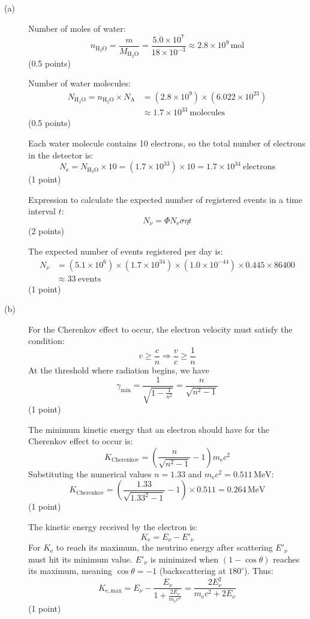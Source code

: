 \begin{description}
\item[(a)] Number of moles of water:
  \[ n_{\mathrm{H_2O}} = \frac{m}{M_{\mathrm{H_2O}}}
     = \frac{5.0 \times 10^7}{18 \times 10^{-3}}
     \approx 2.8 \times 10^9\,\mathrm{mol} \]
  \hfill(0.5 points)

  Number of water molecules:
  \begin{align*}
    N_{\mathrm{H_2O}} = n_{\mathrm{H_2O}} \times N_{\mathrm{A}}
      &= (2.8 \times 10^9) \times (6.022 \times 10^{23}) \\
      &\approx 1.7 \times 10^{33}\ \mathrm{molecules}
  \end{align*}
  \hfill(0.5 points)

  Each water molecule contains 10 electrons, so the total number of electrons
  in the detector is:
  \[ N_{\mathrm{e}} = N_{\mathrm{H_2O}} \times 10
     = (1.7 \times 10^{33}) \times 10 = 1.7 \times 10^{34}\ \mathrm{electrons} \]
  \hfill(1 point)

  Expression to calculate the expected number of registered events in a time
  interval $t$:
  \[ N_\nu = \Phi N_{\mathrm{e}} \sigma \eta t \]
  \hfill(2 points)

  The expected number of events registered per day is:
  \begin{align*}
    N_\nu &= (5.1 \times 10^6) \times (1.7 \times 10^{34})
             \times (1.0 \times 10^{-44}) \times 0.445 \times 86400 \\
          &\approx 33\ \mathrm{events}
  \end{align*}
  \hfill(1 point)

\item[(b)] For the Cherenkov effect to occur, the electron velocity must
  satisfy the condition:
  \[ v \ge \frac{c}{n} \Longrightarrow \frac{v}{c} \ge \frac{1}{n} \]
  At the threshold where radiation begins, we have
  \[ \gamma_{\mathrm{min}} = \frac{1}{\sqrt{1 - \frac{1}{n^2}}}
     = \frac{n}{\sqrt{n^2 - 1}} \]
  \hfill(1 point)

  The minimum kinetic energy that an electron should have for the Cherenkov
  effect to occur is:
  \[ K_{\mathrm{Cherenkov}} = \left(\frac{n}{\sqrt{n^2 - 1}} - 1\right)
     m_{\mathrm{e}}c^2 \]
  Substituting the numerical values $n = 1.33$ and
  $m_{\mathrm{e}}c^2 = 0.511\,\mathrm{MeV}$:
  \[ K_{\mathrm{Cherenkov}} = \left(\frac{1.33}{\sqrt{1.33^2 - 1}} - 1\right)
     \times 0.511 = 0.264\,\mathrm{MeV} \]
  \hfill(1 point)

  The kinetic energy received by the electron is:
  \[ K_{\mathrm{e}} = E_\nu - E'_\nu \]
  For $K_{\mathrm{e}}$ to reach its maximum, the neutrino energy after
  scattering $E'_\nu$ must hit its minimum value. $E'_\nu$ is minimized when
  $(1 - \cos\theta)$ reaches its maximum, meaning $\cos\theta = -1$
  (backscattering at $180^\circ$). Thus:
  \[ K_{\mathrm{e,max}} = E_\nu - \frac{E_\nu}{1 + \frac{2E_\nu}{m_{\mathrm{e}}c^2}}
     = \frac{2E_\nu^2}{m_{\mathrm{e}}c^2 + 2E_\nu} \]
  \hfill(1 point)


\end{description}
